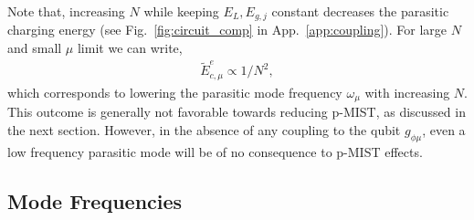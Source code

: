 \documentclass[%
reprint,
superscriptaddress,
 amsmath,amssymb,
 aps,
 prx,
longbibliography,
floatfix,
]{revtex4-2}
\begin{document}
Note that, increasing $N$ while keeping $E_L, E_{g,j}$ constant decreases the parasitic charging energy (see Fig.~\ref{fig:circuit_comp} in App.~\ref{app:coupling}). For large $N$ and small $\mu$ limit we can write,
\begin{align}
\tilde{E}_{c,\mu}^e\propto 1/N^2,  \label{eq:dep2} 
\end{align}
which corresponds to lowering the parasitic mode frequency $\omega_\mu$ with increasing $N$. This outcome is generally not favorable towards reducing p-MIST, as discussed in the next section. However, in the absence of any coupling to the qubit $g_{\phi\mu}$, even a low frequency parasitic mode will be of no consequence to p-MIST effects.

\subsection{Mode Frequencies}\label{mode-frequencies}
\end{document}
